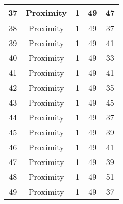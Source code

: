 \documentclass[results.tex]{subfiles}
\begin{document}
\begin{center}
\begin{tabular}{| c || c | c | c | c |}
            \hline
            37                      & Proximity                    & 1                      & 49                      & 47                   \\
            \hline
            38                      & Proximity                    & 1                      & 49                      & 37                   \\
            \hline
            39                      & Proximity                    & 1                      & 49                      & 41                   \\
            \hline
            40                      & Proximity                    & 1                      & 49                      & 33                   \\
            \hline
            41                      & Proximity                    & 1                      & 49                      & 41                   \\
            \hline
            42                      & Proximity                    & 1                      & 49                      & 35                   \\
            \hline
            43                      & Proximity                    & 1                      & 49                      & 45                   \\
            \hline
            44                      & Proximity                    & 1                      & 49                      & 37                   \\
            \hline
            45                      & Proximity                    & 1                      & 49                      & 39                   \\
            \hline
            46                      & Proximity                    & 1                      & 49                      & 41                   \\
            \hline
            47                      & Proximity                    & 1                      & 49                      & 39                   \\
            \hline
            48                      & Proximity                    & 1                      & 49                      & 51                   \\
            \hline
            49                      & Proximity                    & 1                      & 49                      & 37                   \\
            \hline
        \end{tabular}
    \end{center}
\end{document}
